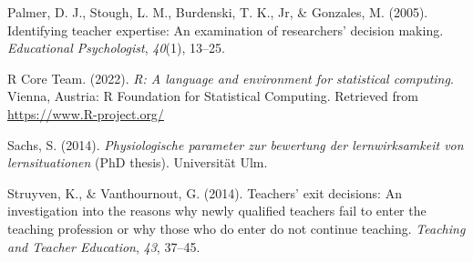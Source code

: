 \documentclass[
  man]{apa6}
\newlength{\cslhangindent}
\newlength{\cslentryspacingunit} %
\newenvironment{CSLReferences}[2] %
 {%
  \setlength{\parindent}{0pt}
  \ifodd #1
  \let\oldpar\par
  \def\par{\hangindent=\cslhangindent\oldpar}
  \fi
  \setlength{\parskip}{#2\cslentryspacingunit}
 }%
 {}
\begin{document}
\begin{CSLReferences}{1}{0}
\leavevmode{}%
Palmer, D. J., Stough, L. M., Burdenski, T. K., Jr, \& Gonzales, M. (2005). Identifying teacher expertise: An examination of researchers' decision making. \emph{Educational Psychologist}, \emph{40}(1), 13--25.

\leavevmode{}%
R Core Team. (2022). \emph{R: A language and environment for statistical computing}. Vienna, Austria: R Foundation for Statistical Computing. Retrieved from \url{https://www.R-project.org/}

\leavevmode{}%
Sachs, S. (2014). \emph{Physiologische parameter zur bewertung der lernwirksamkeit von lernsituationen} (PhD thesis). Universit{ä}t Ulm.

\leavevmode{}%
Struyven, K., \& Vanthournout, G. (2014). Teachers' exit decisions: An investigation into the reasons why newly qualified teachers fail to enter the teaching profession or why those who do enter do not continue teaching. \emph{Teaching and Teacher Education}, \emph{43}, 37--45.

\end{CSLReferences}
\end{document}
